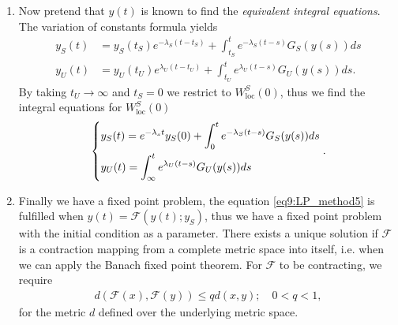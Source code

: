 \begin{enumerate}
\item Now pretend that $y(t)$ is known to find the \emph{equivalent integral equations}. The variation of constants formula yields
	\begin{subequations}
	\begin{align}
		y_{S}(t) &= y_{S}(t_S) e^{- \lambda _{S}(t - t_S)} + \int_{t_S}^{t} e^{-\lambda _{S}(t-s)} G_{S}(y(s)) ds \\
		y_{U}(t) &= y_{U}(t_U) e^{ \lambda _{U}(t - t_U)} + \int_{t_U}^{t} e^{\lambda _{U}(t-s)} G_{U}(y(s)) ds. 
	\end{align}
	\end{subequations}
	By taking $t_{U}\to \infty $ and $t_{S}=0$ we restrict to $W^{S}_{ \textrm{loc} }(0)$, thus we find the integral equations for $W^{S}_{ \textrm{loc} }(0)$
	\begin{align}
		\begin{dcases}
		y_{S}(t) = e^{- \lambda _{s}t}y_{S}(0) + \int_{0}^{t} e^{-\lambda _{S}(t-s)}G_{S}(y(s))ds \\
		y_{U}(t) = \int_{\infty }^{t} e^{\lambda_{U}(t-s)}G_{U}(y(s))ds
		\end{dcases}
		.\label{eq9:LP_method5}		
	\end{align}
\item Finally we have a fixed point problem, the equation \eqref{eq9:LP_method5} is fulfilled when $y(t) = \mathcal{F}(y(t);y_S)$, thus we have a fixed point problem with the initial condition as a parameter. There exists a unique solution if $\mathcal{F}$ is a contraction mapping from a complete metric space into itself, i.e. when we can apply the Banach fixed point theorem. For $\mathcal{F}$ to be contracting, we require
	\begin{align}
		d(\mathcal{F}(x), \mathcal{F}(y)) \leq q d(x,y);\quad 0 < q < 1,
	\end{align}
for the metric $d$ defined over the underlying metric space.


\end{enumerate}
